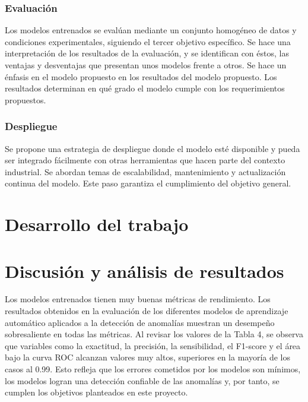 \documentclass[11pt,a4paper,spanish]{book}
\numberwithin{equation}{chapter}
\numberwithin{figure}{chapter}
\begin{document}
\subsection{Evaluación}

Los modelos entrenados se evalúan mediante un conjunto homogéneo de datos y condiciones 
experimentales, siguiendo el tercer objetivo específico. Se hace una interpretación de 
los resultados de la evaluación, y se identifican con éstos, las ventajas y desventajas 
que presentan unos modelos frente a otros. 
Se hace un énfasis en el modelo propuesto en los resultados del modelo propuesto. 
Los resultados determinan en qué grado el modelo cumple con los requerimientos propuestos. 

\subsection{Despliegue}

Se propone una estrategia de despliegue donde el modelo esté disponible y pueda ser 
integrado fácilmente con otras herramientas que hacen parte del contexto industrial. 
Se abordan temas de escalabilidad, mantenimiento y actualización continua del modelo. 
Este paso garantiza el cumplimiento del objetivo general. 



\chapter{Desarrollo del trabajo}



\chapter{Discusión y análisis de resultados}

Los modelos entrenados tienen muy buenas métricas de rendimiento. 
Los resultados obtenidos en la evaluación de los diferentes modelos de aprendizaje 
automático aplicados a la detección de anomalías muestran un desempeño sobresaliente 
en todas las métricas. 
Al revisar los valores de la Tabla 4, se observa que variables como la exactitud, 
la precisión, la sensibilidad, el F1-score y el área bajo la curva ROC alcanzan 
valores muy altos, superiores en la mayoría de los casos al 0.99. Esto refleja que los 
errores cometidos por los modelos son mínimos, los modelos logran una detección 
confiable de las anomalías y, por tanto, se cumplen los objetivos planteados en 
este proyecto.
\end{document}
